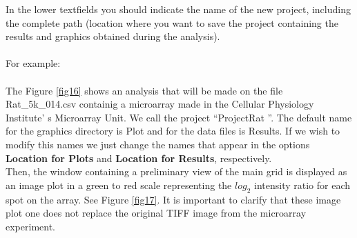 \documentclass[12pt]{article}
\begin{document}
In the lower textfields you should indicate the name of the new project, including the complete path (location where you want to save the project containing the results and graphics obtained during the analysis).\\\\
 For example:\\
 \\
The Figure \ref{fig16} shows an analysis that will be made on the file Rat\_5k\_014.csv containig a microarray made in the Cellular Physiology Institute' s Microarray Unit. We call the project \textquotedblleft ProjectRat \textquotedblright. The default name for the graphics directory is Plot and for the data files is Results. If we wish to modify this names we just change the names that appear in the options \textbf{Location for Plots } and \textbf{Location for Results}, respectively.\\

Then, the window containing a preliminary view of the main grid is displayed as an image plot in a green to red scale representing the $log_2$ intensity ratio for each spot on the array. See Figure \ref{fig17}. It is important to clarify that these image plot one does not replace the original TIFF image from the microarray experiment.
\end{document}
